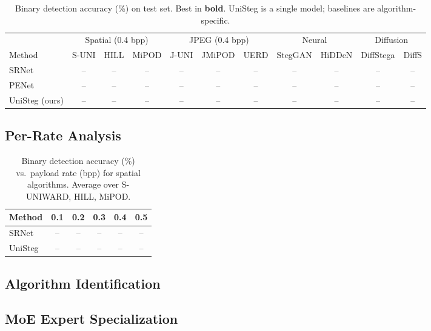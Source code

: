 \documentclass[conference]{IEEEtran}
\newcommand{\method}{UniSteg}
\begin{document}
\begin{table}[t]
  \centering
  \caption{Binary detection accuracy (\%) on test set. Best in \textbf{bold}. \method{} is a single model; baselines are algorithm-specific.}
  \label{tab:main_results}
  \begin{tabular}{l|ccc|ccc|cc|cc}
    \toprule
    & \multicolumn{3}{c|}{Spatial (0.4 bpp)} & \multicolumn{3}{c|}{JPEG (0.4 bpp)} & \multicolumn{2}{c|}{Neural} & \multicolumn{2}{c}{Diffusion} \\
    Method & S-UNI & HILL & MiPOD & J-UNI & JMiPOD & UERD & StegGAN & HiDDeN & DiffStega & DiffS \\
    \midrule
    SRNet & -- & -- & -- & -- & -- & -- & -- & -- & -- & -- \\
    PENet & -- & -- & -- & -- & -- & -- & -- & -- & -- & -- \\
    \midrule
    \method{} (ours) & -- & -- & -- & -- & -- & -- & -- & -- & -- & -- \\
    \bottomrule
  \end{tabular}
\end{table}

\subsection{Per-Rate Analysis}

\begin{table}[t]
  \centering
  \caption{Binary detection accuracy (\%) vs.\ payload rate (bpp) for spatial algorithms. Average over S-UNIWARD, HILL, MiPOD.}
  \label{tab:per_rate}
  \begin{tabular}{lccccc}
    \toprule
    Method & 0.1 & 0.2 & 0.3 & 0.4 & 0.5 \\
    \midrule
    SRNet & -- & -- & -- & -- & -- \\
    \method{} & -- & -- & -- & -- & -- \\
    \bottomrule
  \end{tabular}
\end{table}

\subsection{Algorithm Identification}


\subsection{MoE Expert Specialization}
\end{document}
